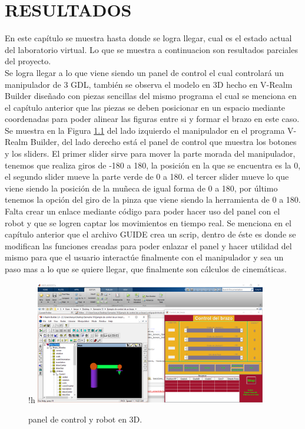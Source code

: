 \renewcommand\thechapter{\Roman{chapter}}
\chapter{RESULTADOS} \label{ch:resultados} \thispagestyle{fancy}
\renewcommand\thechapter{\arabic{chapter}}

En este capítulo se muestra hasta donde se logra llegar, cual es el estado actual del laboratorio virtual. Lo que se muestra a continuacion son resultados parciales del proyecto.\\

Se logra llegar a lo que viene siendo un panel de control el cual controlará un manipulador de 3 GDL, también se observa el modelo en 3D hecho en V-Realm Builder diseñado con piezas sencillas del mismo programa el cual se menciona en el capítulo anterior que las piezas se deben posicionar en un espacio mediante coordenadas para poder alinear las figuras entre si y formar el brazo en este caso.\\

Se muestra en la Figura \ref{matlabescritorio} del lado izquierdo el manipulador en el programa V-Realm Builder, del lado derecho está el panel de control que muestra los botones y los sliders.
El primer slider sirve para mover la parte morada del manipulador, tenemos que realiza giros de -180 a 180, la posición en la que se encuentra es la 0, el segundo slider mueve la parte verde de 0 a 180. el tercer slider mueve lo que viene siendo la posición de la muñeca de igual forma de 0 a 180, por último tenemos la opción del giro de la pinza que viene siendo la herramienta de 0 a 180.\\
Falta crear un enlace mediante código para poder hacer uso del panel con el robot y que se logren captar los movimientos en tiempo real. Se menciona en el capítulo anterior que el archivo GUIDE crea un scrip, dentro de éste es donde se modifican las funciones creadas para poder enlazar el panel y hacer utilidad del mismo para que el usuario interactúe finalmente con el manipulador y sea un paso mas a lo que se quiere llegar, que finalmente son cálculos de cinemáticas.

\begin{figure}{!h}
\centering
\includegraphics[width=0.9\textwidth, height=0.35\textheight]{./figs/matlabescritorio}\\
\caption{panel de control y robot en 3D.}
\label{matlabescritorio}
\end{figure}